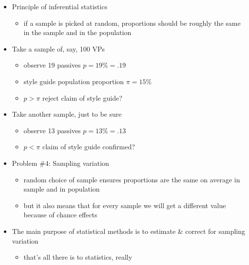 \documentclass[a4paper,landscape,headrule,footrule,dvips]{foils}
\begin{document}
\begin{CJK}{UTF8}{min}
\begin{itemize}
\item Principle of inferential statistics
\begin{itemize}
\item if a sample is picked at random, proportions should be
roughly the same in the sample and in the population
\end{itemize}
\item Take a sample of, say, 100 VPs
\begin{itemize}
\item observe 19 passives \into $p = 19\% = .19$
\item style guide \into population proportion $\pi = 15\%$
\item $p > \pi$ \into reject claim of style guide?
\end{itemize}
\item Take another sample, just to be sure
\begin{itemize}
\item observe 13 passives \into $p = 13\% = .13$
\item $p < \pi$ \into claim of style guide confirmed?
\end{itemize}
\end{itemize}

\begin{itemize}
\item Problem \#4: Sampling variation
  \begin{itemize}
  \item random choice of sample ensures proportions are the
    same on average in sample and in population
\item but it also means that for every sample we will get a
different value because of chance effects
\into {}
\end{itemize}
\item The main purpose of statistical methods is to
estimate \& correct for sampling variation
\begin{itemize}
\item that's all there is to statistics, really \smiley
\end{itemize}
\end{itemize}


\end{CJK}
\end{document}
